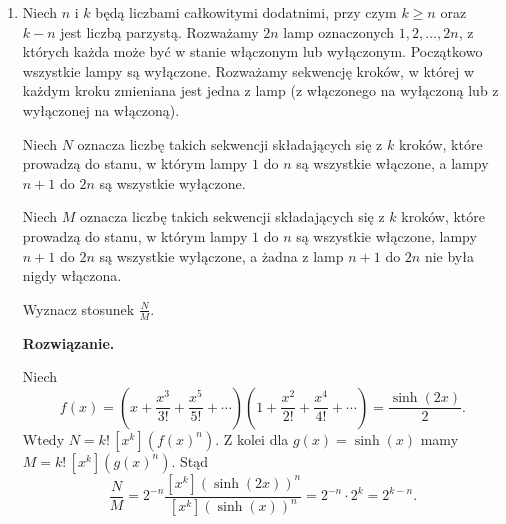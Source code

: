 \documentclass{lecture-kuznia}
\newenvironment{solutionbox}{%
    \begin{mdframed}[style=solstyle]\noindent\textbf{Rozwiązanie.}\par\smallskip
  }{%
    \end{mdframed}
  }
\begin{document}
\begin{enumerate}[label=\textbf{Zad. \arabic*}]
\section{\huge{Zadania bardzo trudne}}
\item Niech $n$ i $k$ będą liczbami całkowitymi dodatnimi, przy czym $k \ge n$ oraz $k - n$ jest liczbą parzystą. Rozważamy $2n$ lamp oznaczonych $1,2,\dots,2n$, z których każda może być w stanie włączonym lub wyłączonym. Początkowo wszystkie lampy są wyłączone. Rozważamy sekwencję kroków, w której w każdym kroku zmieniana jest jedna z lamp (z włączonego na wyłączoną lub z wyłączonej na włączoną).

Niech $N$ oznacza liczbę takich sekwencji składających się z $k$ kroków, które prowadzą do stanu, w którym lampy $1$ do $n$ są wszystkie włączone, a lampy $n+1$ do $2n$ są wszystkie wyłączone.

Niech $M$ oznacza liczbę takich sekwencji składających się z $k$ kroków, które prowadzą do stanu, w którym lampy $1$ do $n$ są wszystkie włączone, lampy $n+1$ do $2n$ są wszystkie wyłączone, a żadna z lamp $n+1$ do $2n$ nie była nigdy włączona.

Wyznacz stosunek $\frac{N}{M}$.
\begin{solutionbox}
Niech
\[
	f(x)=\left(x+\frac{x^3}{3!}+\frac{x^5}{5!}+\cdots\right)
	\left(1+\frac{x^2}{2!}+\frac{x^4}{4!}+\cdots\right)
	=\frac{\sinh(2x)}{2}.
\]
Wtedy $N=k!\,[x^k](f(x)^n)$. Z kolei dla $g(x)=\sinh(x)$ mamy
$M=k!\,[x^k](g(x)^n)$. Stąd
\[
	\frac{N}{M}
	=2^{-n}\frac{[x^k](\sinh(2x))^n}{[x^k](\sinh(x))^n}
	=2^{-n}\cdot 2^k
	=2^{k-n}.
\]
\end{solutionbox}

\end{enumerate}
\end{document}
